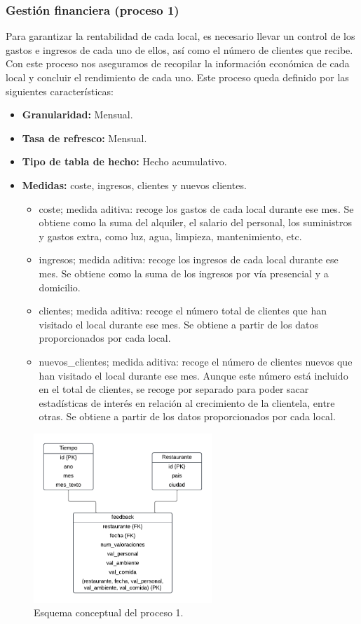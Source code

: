 \documentclass[12pt]{opticajnl}
\begin{document}
\subsubsection{Gestión financiera (proceso 1)}

Para garantizar la rentabilidad de cada local, es necesario llevar un control de los gastos e ingresos de cada uno de ellos, así como el número de clientes que recibe. Con este proceso nos aseguramos de recopilar la información económica de cada local y concluir el rendimiento de cada uno. Este proceso queda definido por las siguientes características:
\begin{itemize}
\item \textbf{Granularidad:} Mensual.
\item \textbf{Tasa de refresco:} Mensual.
\item \textbf{Tipo de tabla de hecho:} Hecho acumulativo.
\item \textbf{Medidas:} coste, ingresos, clientes y nuevos clientes.
\begin{itemize}
\item coste; medida aditiva: recoge los gastos de cada local durante ese mes. Se obtiene como la suma del alquiler, el salario del personal, los suministros y gastos extra, como luz, agua, limpieza, mantenimiento, etc. 
\item ingresos; medida aditiva: recoge los ingresos de cada local durante ese mes. Se obtiene como la suma de los ingresos por vía presencial y a domicilio.
\item clientes; medida aditiva: recoge el número total de clientes que han visitado el local durante ese mes. Se obtiene a partir de los datos proporcionados por cada local.
\item nuevos\_clientes; medida aditiva: recoge el número de clientes nuevos que han visitado el local durante ese mes. Aunque este número está incluido en el total de clientes, se recoge por separado para poder sacar estadísticas de interés en relación al crecimiento de la clientela, entre otras. Se obtiene a partir de los datos proporcionados por cada local.
\end{itemize}
\end{itemize}

\begin{figure}[h]
\centering
\includegraphics[width=0.6\textwidth]{fotos/fin.pdf}
\caption{Esquema conceptual del proceso 1.}
\label{fig:esquema_proceso1}
\end{figure}
\end{document}
